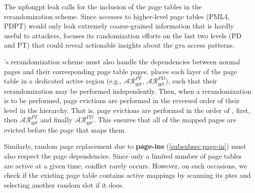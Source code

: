 

	The \gls{npfongpt} leak calls for the inclusion of the page tables in the rerandomization scheme.
	Since accesses to higher-level page tables (PML4, PDPT) would only leak extremely coarse-grained information that is hardly useful to attackers, \thename focuses its randomization efforts on the last two levels (PD and PT) that could reveal actionable insights about the \gls{gva} access patterns.

	\thename's rerandomization scheme must also handle the dependencies between normal pages and their corresponding page table pages.
	\thename places each layer of the page table in a dedicated active region (e.g., $\mathcal{AR}_{gpt}^{PT}$, $\mathcal{AR}_{gpt}^{PD}$), such that their rerandomization may be performed independently.
	Then, when a rerandomization is to be performed, page evictions are performed in the reversed order of their level in the hierarchy.
	That is, page evictions are performed in the order of ,  first, then $\mathcal{AR}_{gpt}^{PT}$ and finally $\mathcal{AR}_{gpt}^{PD}$.
	This ensures that all of the mapped pages are evicted before the page that maps them.

	Similarly, random page replacement due to \textbf{page-ins} (\cref{subsubsec:page-in}) must also respect the page dependencies.
	Since only a limited number of page tables are active at a given time, conflict rarely occurs.
	However, on such occasions, we check if the existing page table contains active mappings by scanning its \glspl{pte} and selecting another random slot if it does.
\fi









